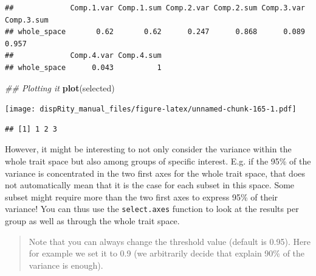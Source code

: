 \documentclass[
]{book}
\newenvironment{Shaded}{\begin{snugshade}}{\end{snugshade}}
\newcommand{\CommentTok}[1]{\textcolor[rgb]{0.56,0.35,0.01}{\textit{#1}}}
\newcommand{\KeywordTok}[1]{\textcolor[rgb]{0.13,0.29,0.53}{\textbf{#1}}}
\newcommand{\NormalTok}[1]{#1}
\newcommand{\OperatorTok}[1]{\textcolor[rgb]{0.81,0.36,0.00}{\textbf{#1}}}
\begin{document}
\begin{verbatim}
##             Comp.1.var Comp.1.sum Comp.2.var Comp.2.sum Comp.3.var Comp.3.sum
## whole_space       0.62       0.62      0.247      0.868      0.089      0.957
##             Comp.4.var Comp.4.sum
## whole_space      0.043          1
\end{verbatim}

\begin{Shaded}
\begin{Highlighting}[]
\CommentTok{\#\# Plotting it}
\KeywordTok{plot}\NormalTok{(selected)}
\end{Highlighting}
\end{Shaded}

\texttt{[image: dispRity\_manual\_files/figure-latex/unnamed-chunk-165-1.pdf]}

\begin{Shaded}
\end{Shaded}

\begin{verbatim}
## [1] 1 2 3
\end{verbatim}

However, it might be interesting to not only consider the variance within the whole trait space but also among groups of specific interest.
E.g. if the 95\% of the variance is concentrated in the two first axes for the whole trait space, that does not automatically mean that it is the case for each subset in this space. Some subset might require more than the two first axes to express 95\% of their variance!
You can thus use the \texttt{select.axes} function to look at the results per group as well as through the whole trait space.

\begin{quote}
Note that you can always change the threshold value (default is 0.95). Here for example we set it to 0.9 (we arbitrarily decide that explain 90\% of the variance is enough).
\end{quote}
\end{document}
